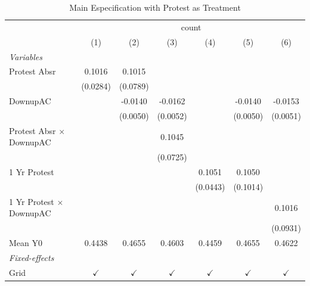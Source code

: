 
\begin{table}[htbp]
   \caption{\label{tab:protest_treat_main} Main Especification with Protest as Treatment}
   \centering
   \begin{tabular}{lcccccc}
      \tabularnewline \midrule \midrule
       & \multicolumn{6}{c}{count}\\
                                       & (1)           & (2)           & (3)           & (4)           & (5)           & (6)\\  
      \midrule
      \emph{Variables}\\
      Protest Absr                     & 0.1016        & 0.1015        &               &               &               &   \\   
                                       & (0.0284)      & (0.0789)      &               &               &               &   \\   
      DownupAC                         &               & -0.0140       & -0.0162       &               & -0.0140       & -0.0153\\   
                                       &               & (0.0050)      & (0.0052)      &               & (0.0050)      & (0.0051)\\   
      Protest Absr $\times$ DownupAC   &               &               & 0.1045        &               &               &   \\   
                                       &               &               & (0.0725)      &               &               &   \\   
      1 Yr Protest                     &               &               &               & 0.1051        & 0.1050        &   \\   
                                       &               &               &               & (0.0443)      & (0.1014)      &   \\   
      1 Yr Protest $\times$ DownupAC   &               &               &               &               &               & 0.1016\\   
                                       &               &               &               &               &               & (0.0931)\\   
      Mean Y0                          & 0.4438        & 0.4655        & 0.4603        & 0.4459        & 0.4655        & 0.4622\\  
      \midrule
      \emph{Fixed-effects}\\
      Grid                             & $\checkmark$  & $\checkmark$  & $\checkmark$  & $\checkmark$  & $\checkmark$  & $\checkmark$\\   

\end{tabular}
\end{table}
